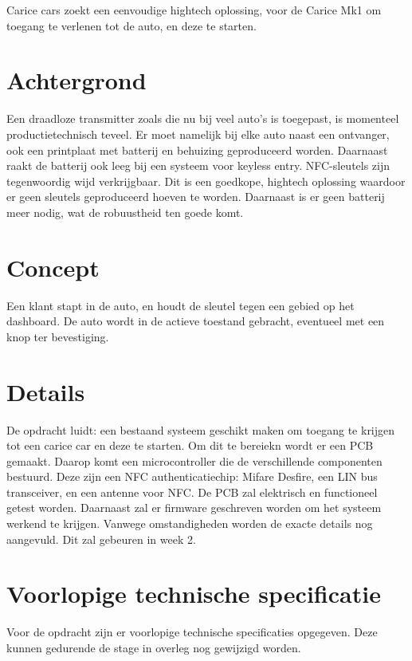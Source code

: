 Carice cars zoekt een eenvoudige hightech oplossing, voor de Carice Mk1 om toegang te verlenen tot de auto, en deze te starten. \newline
\section{Achtergrond}
Een draadloze transmitter zoals die nu bij veel auto's is toegepast, is momenteel productietechnisch teveel. Er moet namelijk bij elke auto naast een ontvanger, ook een printplaat met batterij en behuizing geproduceerd worden. Daarnaast raakt de batterij ook leeg bij een systeem voor keyless entry. \newline
NFC-sleutels zijn tegenwoordig wijd verkrijgbaar. Dit is een goedkope, hightech oplossing waardoor er geen sleutels geproduceerd hoeven te worden. Daarnaast is er geen batterij meer nodig, wat de robuustheid ten goede komt. 

\section{Concept}
Een klant stapt in de auto, en houdt de sleutel tegen een gebied op het dashboard. De auto wordt in de actieve toestand gebracht, eventueel met een knop ter bevestiging.

\section{Details}
De opdracht luidt: een bestaand systeem geschikt maken om toegang te krijgen tot een carice car en deze te starten.
Om dit te bereiekn wordt er een PCB gemaakt. Daarop komt een microcontroller die de verschillende componenten bestuurd. Deze zijn een NFC authenticatiechip: Mifare Desfire, een LIN bus transceiver, en een antenne voor NFC. 
De PCB zal elektrisch en functioneel getest worden.
Daarnaast zal er firmware geschreven worden om het systeem werkend te krijgen.
Vanwege omstandigheden worden de exacte details nog aangevuld. Dit zal gebeuren in week 2.

\section{Voorlopige technische specificatie}

Voor de opdracht zijn er voorlopige technische specificaties opgegeven. Deze kunnen gedurende de stage in overleg nog gewijzigd worden.


